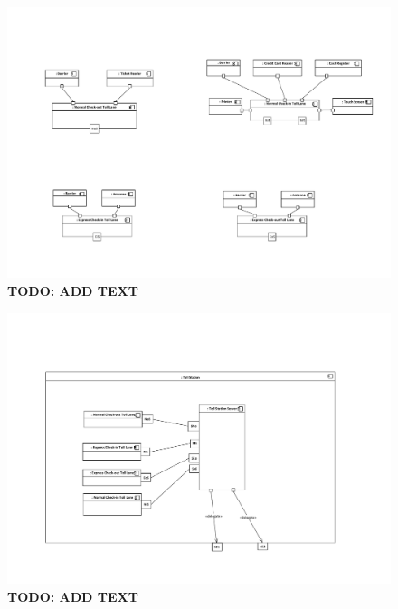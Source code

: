 \begin{figure}
\centerline{\includegraphics[width=\textwidth]{img/composite_structure_diagrams/cscd_toll_lane_normal_out}}
\caption{\textbf{TODO: ADD TEXT}}
\label{fig:csd_tlno}
\end{figure}


\begin{figure}
\centerline{\includegraphics[width=\textwidth]{img/composite_structure_diagrams/cscd_toll_station}}
\caption{\textbf{TODO: ADD TEXT}}
\label{fig:csd_ts}
\end{figure}


